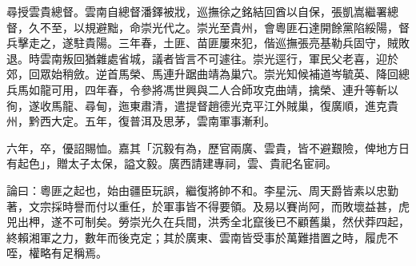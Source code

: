 \begin{pinyinscope}
尋授雲貴總督。雲南自總督潘鐸被戕，巡撫徐之銘結回酋以自保，張凱嵩繼署總督，久不至，以規避黜，命崇光代之。崇光至貴州，會粵匪石達開餘黨陷綏陽，督兵擊走之，遂駐貴陽。三年春，土匪、苗匪屢來犯，偕巡撫張亮基勒兵固守，賊敗退。時雲南叛回猶雜處省城，議者皆言不可遽往。崇光逕行，軍民父老喜，迎於郊，回眾始稍斂。逆首馬榮、馬連升踞曲靖為巢穴。崇光知候補道岑毓英、降回總兵馬如龍可用，四年春，令參將馮世興與二人合師攻克曲靖，擒榮、連升等斬以徇，遂收馬龍、尋甸，迤東肅清，遣提督趙德光克平江外賊巢，復廣順，進克貴州，黔西大定。五年，復普洱及思茅，雲南軍事漸利。

六年，卒，優詔賜恤。嘉其「沉毅有為，歷官兩廣、雲貴，皆不避艱險，俾地方日有起色」，贈太子太保，謚文毅。廣西請建專祠，雲、貴祀名宦祠。

論曰：粵匪之起也，始由疆臣玩誤，繼復將帥不和。李星沅、周天爵皆素以忠勤著，文宗採時譽而付以重任，於軍事皆不得要領。及易以賽尚阿，而敗壞益甚，虎兕出柙，遂不可制矣。勞崇光久在兵間，洪秀全北竄後已不顧舊巢，然伏莽四起，終賴湘軍之力，數年而後克定；其於廣東、雲南皆受事於萬難措置之時，履虎不咥，權略有足稱焉。


\end{pinyinscope}